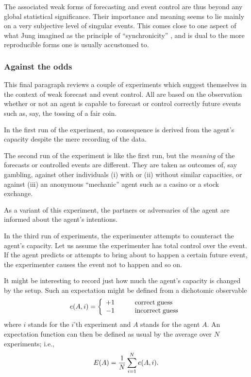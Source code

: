 The associated weak forms of forecasting and
event control are thus beyond any global statistical significance. Their
importance and meaning seems to lie mainly on a very subjective level of
singular events. This comes close to one aspect of what  Jung imagined
as the principle of ``synchronicity'' \cite{jung1},
and is dual to the more reproducible forms one is usually accustomed to.


\subsubsection*{Against the odds}
This final paragraph reviews a couple of experiments which suggest
themselves in the context of weak forecast and event control.
All are based on the observation whether or not an agent is capable
to forecast or control correctly
future events such as, say, the tossing of a fair coin.

In the first run of the experiment, no consequence is derived from the
agent's capacity despite the mere recording of the data.

The second run of the experiment is like the first run, but the {\em
meaning} of the forecasts or controlled events are different. They are
taken as outcomes of, say gambling, against other individuals (i) with
or (ii)
without similar capacities, or against (iii) an anonymous ``mechanic''
agent such as a casino or a stock exchange.

As a variant of this experiment, the partners or adversaries of the
agent are informed about the agent's intentions.

In the third run of experiments, the experimenter attempts to counteract
the agent's capacity. Let us assume the experimenter has total control
over the event. If the agent predicts or attempts to bring
about to happen a certain future event, the experimenter causes the
event not to happen and so on.

It might be interesting to record just how much the agent's capacity
is changed by the setup. Such an expectation might be defined from
a dichotomic observable
$$e(A,i) =\left\{
\begin{array}{cl}
+1&\qquad {\rm correct\; guess}\\
-1&\qquad {\rm incorrect\; guess}\\
\end{array}
\right.
$$
where $i$ stands for the $i$'th experiment and $A$ stands for the agent
$A$. An expectation function can then be defined as usual by the average
over $N$ experiments; i.e.,
$$E(A) = {1\over N}\sum_{i=1}^N e(A,i).$$

